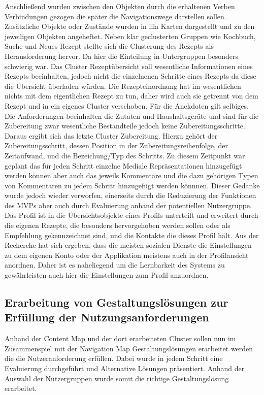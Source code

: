 Anschließend wurden zwischen den Objekten durch die erhaltenen Verben Verbindungen gezogen die später die Navigationswege darstellen sollen. Zusätzliche Objekte oder Zustände wurden in lila Karten dargestellt und zu den jeweiligen Objekten angeheftet. Neben klar geclusterten Gruppen wie Kochbuch, Suche und Neues Rezept stellte sich die Clusterung des Rezepts als Herausforderung hervor. Da hier die Einteilung in Untergruppen besonders schwierig war. Das Cluster Rezeptübersicht soll wesentliche Informationen eines Rezepts beeinhalten, jedoch nicht die einzelnenen Schritte eines Rezepts da diese die Übersicht überladen würden. Die Rezepteinordnung hat im wesentlichen nichts mit dem eigentlichen Rezept zu tun, daher wird auch sie getrennt von dem Rezept und in ein eigenes Cluster verschoben. Für die Anekdoten gilt selbiges. Die Anforderungen beeinhalten die Zutaten und Haushaltsgeräte und sind für die Zubereitung zwar wesentliche Bestandteile jedoch keine Zubereitungsschritte. Daraus ergibt sich das letzte Cluster Zubereitung. Hierzu gehört der Zubereitungsschritt, dessen Position in der Zubereitungsreihenfolge, der Zeitaufwand, und die Bezeichung/Typ des Schritts. Zu diesem Zeitpunkt war geplant das für jeden Schritt einzelne Mediale Repräsentationen hinzugefügt werden können aber auch das jeweils Kommentare und die dazu gehörigen Typen von Kommentaren zu jedem Schritt hinzugefügt werden könnnen. Dieser Gedanke wurde jedoch wieder verworfen, einerseits durch die Reduzierung der Funktionen des MVPs aber auch durch Evaluierung anhand der potentiellen Nutzergruppe. Das Profil ist in die Übersichtsobjekte eines Profils unterteilt und erweitert durch die eigenen Rezepte, die besonders hervorgehoben werden sollen oder als Empfehlung gekennzeichnet sind, und die Kontakte die dieses Profil hält. Aus der Recherche hat sich ergeben, dass die meisten sozialen Dienste die Einstellungen zu dem eigenen Konto oder der Applikation meistens auch in der Profilansicht anordnen. Daher ist es naheliegend um die Lernbarkeit des Systems zu gewährleisten auch hier die Einstellungen zum Profil anzuordnen. \\

\subsection{Erarbeitung von Gestaltungslösungen zur Erfüllung der Nutzungsanforderungen}
Anhand der Content Map und der dort erarbeiteten Cluster sollen nun im Zusammenspiel mit der Navigation Map Gestaltungslösungen erarbeitet werden die die Nutzeranforderung erfüllen. Dabei wurde in jedem Schritt eine Evaluierung durchgeführt und Alternative Lösungen präsentiert. Anhand der Auswahl der Nutzergruppen wurde somit die richtige Gestaltungslösung erarbeitet.

